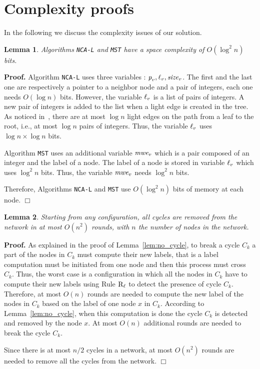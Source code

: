 \documentclass[11pt,a4paper]{article}
\newtheorem{lemma}{Lemma}
\newenvironment{proof}{\noindent \begin{rm}{\textbf{Proof.} }}{\hspace*{\fill}$\Box$\par\end{rm}}
\newcommand{\parent}{\mbox{\it p}}
\newcommand{\lab}{\mbox{\rm $\ell$}}
\newcommand{\TS}{\mbox{\it size}}
\newcommand{\m}{\mbox{\it mwe}}
\newcommand{\MST}{\mbox{\tt MST}}
\newcommand{\LabA}{\mbox{\tt NCA-L}}
\begin{document}
\section{Complexity proofs}
In the following we discuss the complexity issues of our solution. 


\begin{lemma}
Algorithms \LabA\/ and \MST\/ have a space complexity of $O(\log^2n)$ bits.
\end{lemma}

\begin{proof}
Algorithm \LabA\/ uses three variables : $\parent_v, \lab_v,
\TS_v$. The first and the last one are respectively a pointer to 
a neighbor node and a pair of integers, each one needs $O(\log n)$
bits. However, the variable $\lab_v$ is a list 
of pairs of integers. A new pair of integers is added to the list when
a light edge is created in the tree. 
As noticed in~\cite{AGKR02}, there are at most $\log n$ light edges on
the path from a leaf to the root, i.e., 
at most $\log n$ pairs of integers. Thus, the variable $\lab_v$ uses $\log n \times \log n$ bits.

Algorithm \MST\/ uses an additional variable $\m_v$ which is a pair
composed of an integer and the label of a node. 
The label of a node is stored in variable $\lab_v$ which uses $\log^2 n$ bits. Thus, the variable $\m_v$ needs $\log^2 n$ bits.

Therefore, Algorithms \LabA\/ and \MST\/ use $O(\log^2n)$ bits of memory at each node.
\end{proof}

\begin{lemma}
\label{lem:no_cycle_complexity}
Starting from any configuration, all cycles are removed from the network in at most $O(n^2)$ rounds, with $n$ the number of nodes in the network.
\end{lemma}

\begin{proof}
As explained in the proof of Lemma~\ref{lem:no_cycle}, to break a cycle $C_k$ a part of the nodes in $C_k$ must compute their new labels, that is a label computation must be initiated from one node and then this process must cross $C_k$. Thus, the worst case is a configuration in which all the nodes in $C_k$ have to compute their new labels using Rule $\mbox{\rm R$_{\ell}$}$ to detect the presence of cycle $C_k$. Therefore, at most $O(n)$ rounds are needed to compute the new label of the nodes in $C_k$ based on the label of one node $x$ in $C_k$. According to Lemma~\ref{lem:no_cycle}, when this computation is done the cycle $C_k$ is detected and removed by the node $x$. At most $O(n)$ additional rounds are needed to break the cycle $C_k$.

Since there is at most $n/2$ cycles in a network, at most $O(n^2)$ rounds are needed to remove all the cycles from the network.
\end{proof}
\end{document}
